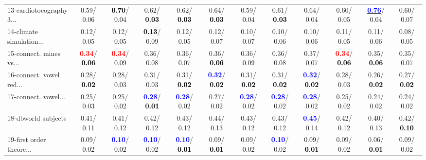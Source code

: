 \begin{table}[h]
\begin{center}
{\begin{tabular}{lc|c|c|c|c|c|c|c|c|c|c}
13-cardiotocography 3... &   0.59/  0.06 & \textcolor{black}{\textbf{  0.70}}/  0.04 &   0.62/\textcolor{black}{\textbf{  0.03}} &   0.62/\textcolor{black}{\textbf{  0.03}} &   0.64/\textcolor{black}{\textbf{  0.03}} &   0.59/  0.04 &   0.61/\textcolor{black}{\textbf{  0.03}} &   0.64/  0.04 &   0.60/  0.05 & \underline{\textcolor{blue}{\textbf{  0.76}}}/  0.04 &   0.60/  0.07 \\
14-climate simulation... &   0.12/  0.05 &   0.12/  0.05 & \textcolor{black}{\textbf{  0.13}}/  0.09 &   0.12/  0.05 &   0.12/  0.07 &   0.10/  0.07 &   0.10/  0.06 &   0.10/  0.06 &   0.11/  0.05 &   0.11/  0.06 &   0.08/  0.05 \\ \hline
15-connect. mines vs... & \textcolor{red}{\textbf{  0.34}}/\textcolor{black}{\textbf{  0.06}} & \textcolor{red}{\textbf{  0.34}}/  0.09 &   0.36/  0.08 &   0.36/  0.07 &   0.36/\textcolor{black}{\textbf{  0.06}} &   0.36/  0.09 &   0.36/  0.08 &   0.37/  0.07 & \textcolor{red}{\textbf{  0.34}}/\textcolor{black}{\textbf{  0.06}} &   0.35/\textcolor{black}{\textbf{  0.06}} &   0.35/  0.07 \\
16-connect. vowel red... &   0.28/\textcolor{black}{\textbf{  0.02}} &   0.28/  0.03 &   0.31/  0.03 &   0.31/\textcolor{black}{\textbf{  0.02}} & \textcolor{blue}{\textbf{  0.32}}/\textcolor{black}{\textbf{  0.02}} &   0.31/\textcolor{black}{\textbf{  0.02}} &   0.31/\textcolor{black}{\textbf{  0.02}} & \textcolor{blue}{\textbf{  0.32}}/\textcolor{black}{\textbf{  0.02}} &   0.28/  0.03 &   0.26/\textcolor{black}{\textbf{  0.02}} &   0.27/\textcolor{black}{\textbf{  0.02}} \\
17-connect. vowel... &   0.25/  0.03 &   0.25/  0.02 & \textcolor{blue}{\textbf{  0.28}}/\textcolor{black}{\textbf{  0.01}} & \textcolor{blue}{\textbf{  0.28}}/  0.02 &   0.27/  0.02 & \textcolor{blue}{\textbf{  0.28}}/  0.02 & \textcolor{blue}{\textbf{  0.28}}/  0.02 & \textcolor{blue}{\textbf{  0.28}}/  0.02 &   0.25/  0.02 &   0.24/  0.02 &   0.24/  0.02 \\
18-dbworld subjects &   0.41/  0.11 &   0.41/  0.12 &   0.42/  0.12 &   0.43/  0.12 &   0.44/  0.13 &   0.43/  0.12 &   0.43/  0.12 & \textcolor{blue}{\textbf{  0.45}}/  0.14 &   0.42/  0.12 &   0.40/  0.13 &   0.42/\textcolor{black}{\textbf{  0.10}} \\
19-first order theore... &   0.09/  0.02 & \textcolor{blue}{\textbf{  0.10}}/  0.02 & \textcolor{blue}{\textbf{  0.10}}/  0.02 & \textcolor{blue}{\textbf{  0.10}}/\textcolor{black}{\textbf{  0.01}} &   0.09/\textcolor{black}{\textbf{  0.01}} &   0.09/  0.02 & \textcolor{blue}{\textbf{  0.10}}/  0.02 &   0.09/\textcolor{black}{\textbf{  0.01}} &   0.09/  0.02 &   0.06/\textcolor{black}{\textbf{  0.01}} &   0.09/  0.02 \\

\end{tabular}}
\end{center}
\end{table}

